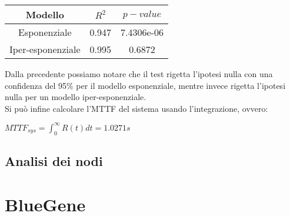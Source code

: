 \begin{table}[htbp]
    \centering
    \label{tab:esempio}
    \begin{tabular}{|c|c|c|} %
        \hline
        Modello & $R^2$ & $p-value$ \\ %
        \hline
        Esponenziale & 0.947 &  7.4306e-06\\
        Iper-esponenziale & 0.995 &  0.6872\\
        \hline
    \end{tabular}
\end{table}
\noindent
Dalla precedente possiamo notare che il test rigetta l'ipotesi nulla con una confidenza del 95\% per il modello esponenziale, mentre invece rigetta l'ipotesi nulla per un modello iper-esponenziale.\\
Si può infine calcolare l'MTTF del sistema usando l'integrazione, ovvero:
\begin{center}
$MTTF_{sys} = \int_{0}^{\infty} R(t) dt = 1.0271s$
\end{center}
\subsection{Analisi dei nodi}
\section{BlueGene}
